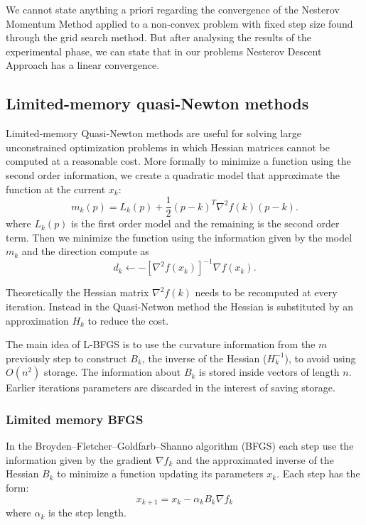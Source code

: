 We cannot state anything a priori regarding the convergence of the Nesterov Momentum Method applied to a non-convex problem with fixed step size found through the grid search method. But after analysing the results of the experimental phase, we can state that in our problems Nesterov Descent Approach has a linear convergence.

\subsection{Limited-memory quasi-Newton methods}
Limited-memory Quasi-Newton methods are useful for solving large unconstrained optimization problems in which Hessian matrices cannot be computed at a reasonable cost. More formally to minimize a function using the second order information, we create a quadratic model that approximate the function at the current $x_{k}$:
\begin{equation}
m_{k}(p)=L_{k}(p)+ \frac{1}{2}(p-k)^T\nabla^2 f(k)(p-k).
\end{equation}
where $L_{k}(p)$ is the first order model and the remaining is the second order term. Then we minimize the function using the information given by the model $m_{k}$ and the direction compute as 
\begin{equation}
d_{k} \leftarrow -[\nabla^2f(x_{k})]^{-1}\nabla f(x_{k}).
\end{equation}

Theoretically  the Hessian matrix $\nabla^2 f(k)$ needs to be recomputed at every iteration. Instead in the Quasi-Netwon method the Hessian is substituted by an approximation $ H_{k}$ to reduce the cost. 

The main idea of L-BFGS is to use the curvature information from the $m$ previously step to construct $B_{k}$, the inverse of the Hessian ($H_{k}^{-1}$), to avoid using $O(n^2)$ storage. The information about $B_{k}$ is stored inside vectors of length $n$. Earlier iterations parameters are discarded in the interest of saving storage.

\subsubsection{Limited memory BFGS}
\label{L-BFGS}
In the Broyden–Fletcher–Goldfarb–Shanno algorithm (BFGS) each step use the information given by the gradient $\nabla f_{k}$ and the approximated inverse of the Hessian $B_{k}$ to minimize  a function updating its parameters $x_{k}$. Each step has the form: 
\begin{equation}
\label{direction}
x_{k+1} = x_{k} - \alpha_{k}B_{k}\nabla f_{k}
\end{equation} 
where $\alpha_{k}$ is the step length.

